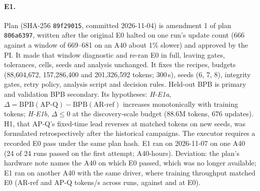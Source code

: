 \documentclass{article}
\begin{document}
\paragraph{E1.} Plan  (SHA-256 \texttt{89f29015}, committed 2026-11-04) is amendment 1 of plan \texttt{806a6397}, written after the original E0 halted on one run's update count (666 against a window of 669--681 on an A40 about 1\% slower) and approved by the PI. It made that window diagnostic and re-ran E0 in full, leaving gates, tolerances, cells, seeds and analysis unchanged. It fixes the recipes, budgets (88,604,672, 157,286,400 and 201,326,592 tokens; 300\,s), seeds (6, 7, 8), integrity gates, retry policy, analysis script and decision rules. Held-out BPB is primary and validation BPB secondary. Its hypotheses: \emph{H-E1a}, $\Delta=\mathrm{BPB}(\text{AP-Q})-\mathrm{BPB}(\text{AR-ref})$ increases monotonically with training tokens; \emph{H-E1b}, $\Delta\le0$ at the discovery-scale budget (88.6M tokens, 676 updates). H1, that AP-Q's fixed-time lead reverses at matched tokens on new seeds, was formulated retrospectively after the historical campaigns. The executor requires a recorded E0 pass under the same plan hash. E1 ran on 2026-11-07 on one A40 (24 of 24 runs passed on the first attempt; \CREOneHours{} A40-hours). Deviation: the plan's hardware note names the A40 on which E0 passed, which was no longer available; E1 ran on another A40 with the same driver, where training throughput matched E0 (AR-ref \CREOneTputAR{} and AP-Q \CREOneTputAP{} tokens/s across runs, against \CREZeroTputAR{} and \CREZeroTputAP{} at E0).
\end{document}
